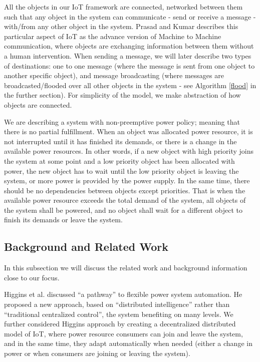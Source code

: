 \documentclass[../main/IoT.tex]{subfiles}
\begin{document}
All the objects in our IoT framework are connected, networked between them such that any object in the system can communicate - send or receive a message - with/from any other object in the system. Prasad and Kumar \cite{prasad2012energy} describes this particular aspect of IoT as the advance version of Machine to Machine communication, where objects are exchanging information between them without a human intervention. When sending a message, we will later describe two types of destinations: one to one message (where the message is sent from one object to another specific object), and message broadcasting (where messages are broadcasted/flooded over all other objects in the system - see Algorithm \ref{flood} in the further section). For simplicity of the model, we make abstraction of how objects are connected.

We are describing a system with non-preemptive power policy; meaning that there is no partial fulfillment. When an object was allocated power resource, it is not interrupted until it has finished its demands, or there is a change in the available power resources. In other words, if a new object with high priority joins the system at some point and a low priority object has been allocated with power, the new object has to wait until the low priority object is leaving the system, or more power is provided by the power supply. In the same time, there should be no dependencies between objects except priorities. That is when the available power resource exceeds the total demand of the system, all objects of the system shall be powered, and no object shall wait for a different object to finish its demands or leave the system.

\subsection{Background and Related Work}

In this subsection we will discuss the related work and background information close to our focus. 

Higgins et al. \cite{higgins2011distributed} discussed ``a pathway'' to flexible power system automation. He proposed a new approach, based on ``distributed intelligence'' rather than ``traditional centralized control'', the system benefiting on many levels. We further considered Higgins approach by creating a decentralized distributed model of IoT, where power resource consumers can join and leave the system, and in the same time, they adapt automatically when needed (either a change in power or when consumers are joining or leaving the system).
\end{document}

